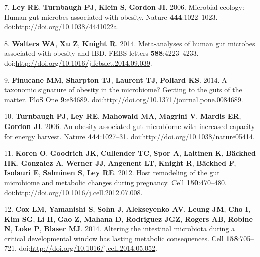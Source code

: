 \documentclass[12pt,]{article}
\begin{document}
7. \textbf{Ley RE}, \textbf{Turnbaugh PJ}, \textbf{Klein S},
\textbf{Gordon JI}. 2006. Microbial ecology: Human gut microbes
associated with obesity. Nature \textbf{444}:1022--1023.
doi:\url{http://doi.org/10.1038/4441022a}.

8. \textbf{Walters WA}, \textbf{Xu Z}, \textbf{Knight R}. 2014.
Meta-analyses of human gut microbes associated with obesity and IBD.
FEBS letters \textbf{588}:4223--4233.
doi:\url{http://doi.org/10.1016/j.febslet.2014.09.039}.

9. \textbf{Finucane MM}, \textbf{Sharpton TJ}, \textbf{Laurent TJ},
\textbf{Pollard KS}. 2014. A taxonomic signature of obesity in the
microbiome? Getting to the guts of the matter. PloS One
\textbf{9}:e84689.
doi:\url{http://doi.org/10.1371/journal.pone.0084689}.

10. \textbf{Turnbaugh PJ}, \textbf{Ley RE}, \textbf{Mahowald MA},
\textbf{Magrini V}, \textbf{Mardis ER}, \textbf{Gordon JI}. 2006. An
obesity-associated gut microbiome with increased capacity for energy
harvest. Nature \textbf{444}:1027--31.
doi:\url{http://doi.org/10.1038/nature05414}.

11. \textbf{Koren O}, \textbf{Goodrich JK}, \textbf{Cullender TC},
\textbf{Spor A}, \textbf{Laitinen K}, \textbf{Bäckhed HK},
\textbf{Gonzalez A}, \textbf{Werner JJ}, \textbf{Angenent LT},
\textbf{Knight R}, \textbf{Bäckhed F}, \textbf{Isolauri E},
\textbf{Salminen S}, \textbf{Ley RE}. 2012. Host remodeling of the gut
microbiome and metabolic changes during pregnancy. Cell
\textbf{150}:470--480.
doi:\url{http://doi.org/10.1016/j.cell.2012.07.008}.

12. \textbf{Cox LM}, \textbf{Yamanishi S}, \textbf{Sohn J},
\textbf{Alekseyenko AV}, \textbf{Leung JM}, \textbf{Cho I}, \textbf{Kim
SG}, \textbf{Li H}, \textbf{Gao Z}, \textbf{Mahana D}, \textbf{Rodriguez
JGZ}, \textbf{Rogers AB}, \textbf{Robine N}, \textbf{Loke P},
\textbf{Blaser MJ}. 2014. Altering the intestinal microbiota during a
critical developmental window has lasting metabolic consequences. Cell
\textbf{158}:705--721.
doi:\url{http://doi.org/10.1016/j.cell.2014.05.052}.
\end{document}
